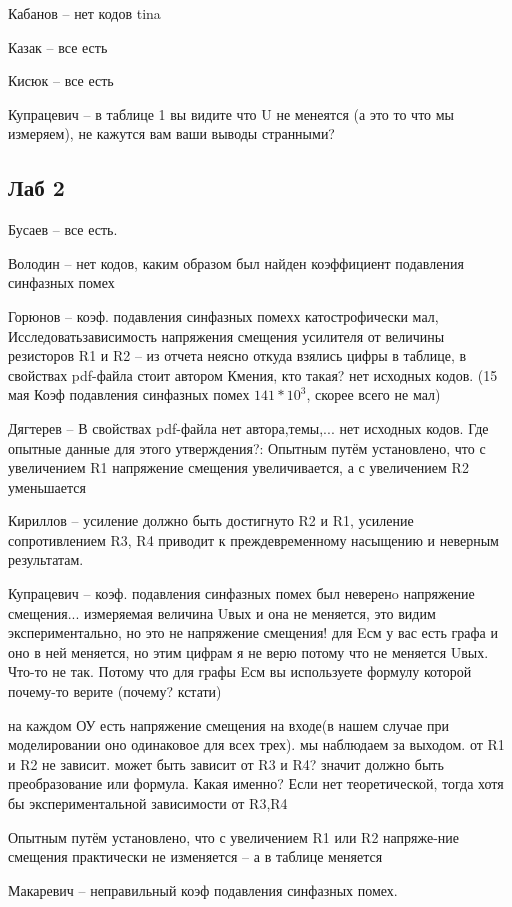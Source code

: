 \documentclass[a4paper,11pt]{article}
\begin{document}
Кабанов -- нет кодов tina

Казак -- все есть

Кисюк -- все есть

Купрацевич -- в таблице 1 вы видите что U не менеятся (а это то что мы измеряем), не кажутся вам ваши выводы странными? 

\newpage
\subsection*{Лаб 2}

Бусаев -- все есть.

Володин -- нет кодов, каким образом был найден коэффициент подавления синфазных помех

Горюнов -- коэф. подавления синфазных помехх катострофически мал, Исследоватьзависимость напряжения смещения усилителя от величины резисторов R1 и R2
-- из отчета неясно откуда взялись цифры в таблице, в свойствах pdf-файла стоит автором Кмения, кто такая? нет исходных кодов. 
(15 мая Коэф подавления синфазных помех $141*10^3$, скорее всего не мал)

Дягтерев --  В свойствах pdf-файла нет автора,темы,... нет исходных кодов. Где опытные данные для этого утверждения?: Опытным путём установлено, что с увеличением R1 напряжение смещения увеличивается, а с увеличением R2 уменьшается

Кириллов -- усиление должно быть достигнуто R2 и R1, усиление сопротивлением R3, R4 приводит к преждевременному насыщению и неверным результатам.


Купрацевич -- коэф. подавления синфазных помех был неверенo
напряжение смещения...
измеряемая величина Uвых и она не меняется, это видим экспериментально,
но это не напряжение смещения! для Eсм у вас есть графа и оно в ней меняется, но этим цифрам я не верю потому что не меняется Uвых.
Что-то не так.
Потому что для графы Eсм вы используете формулу которой почему-то верите (почему? кстати)

на каждом ОУ есть напряжение смещения на входе(в нашем случае при моделировании оно одинаковое для всех трех). мы наблюдаем за выходом. от R1 и R2 не зависит. может быть зависит от R3 и R4? значит должно быть преобразование или формула.
Какая именно? Если нет теоретической, тогда хотя бы экспериментальной зависимости от R3,R4

Опытным путём установлено, что с увеличением R1 или R2 напряже-ние смещения практически не изменяется -- а в таблице меняется


Макаревич -- неправильный коэф подавления синфазных помех.
\end{document}
